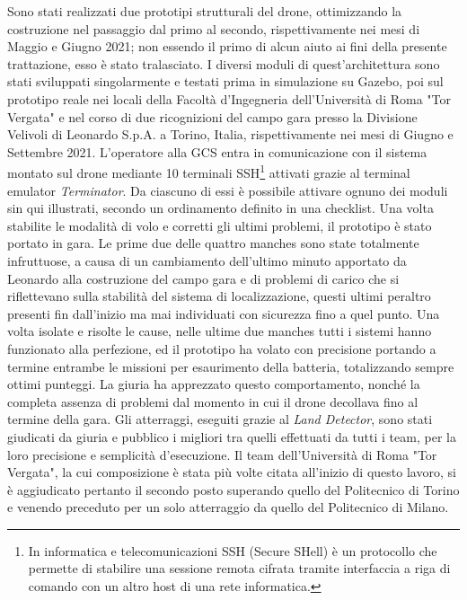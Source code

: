 \indent Sono stati realizzati due prototipi strutturali del drone, ottimizzando la costruzione nel passaggio dal primo al secondo, rispettivamente nei mesi di Maggio e Giugno 2021; non essendo il primo di alcun aiuto ai fini della presente trattazione, esso è stato tralasciato. I diversi moduli di quest'architettura sono stati sviluppati singolarmente e testati prima in simulazione su Gazebo, poi sul prototipo reale nei locali della Facoltà d'Ingegneria dell'Università di Roma "Tor Vergata" e nel corso di due ricognizioni del campo gara presso la Divisione Velivoli di Leonardo S.p.A. a Torino, Italia, rispettivamente nei mesi di Giugno e Settembre 2021. L'operatore alla GCS entra in comunicazione con il sistema montato sul drone mediante 10 terminali SSH\footnote{In informatica e telecomunicazioni SSH (Secure SHell) è un protocollo che permette di stabilire una sessione remota cifrata tramite interfaccia a riga di comando con un altro host di una rete informatica.} attivati grazie al terminal emulator \emph{Terminator}. Da ciascuno di essi è possibile attivare ognuno dei moduli sin qui illustrati, secondo un ordinamento definito in una checklist. Una volta stabilite le modalità di volo e corretti gli ultimi problemi, il prototipo è stato portato in gara. Le prime due delle quattro manches sono state totalmente infruttuose, a causa di un cambiamento dell'ultimo minuto apportato da Leonardo alla costruzione del campo gara e di problemi di carico che si riflettevano sulla stabilità del sistema di localizzazione, questi ultimi peraltro presenti fin dall'inizio ma mai individuati con sicurezza fino a quel punto. Una volta isolate e risolte le cause, nelle ultime due manches tutti i sistemi hanno funzionato alla perfezione, ed il prototipo ha volato con precisione portando a termine entrambe le missioni per esaurimento della batteria, totalizzando sempre ottimi punteggi. La giuria ha apprezzato questo comportamento, nonché la completa assenza di problemi dal momento in cui il drone decollava fino al termine della gara. Gli atterraggi, eseguiti grazie al \emph{Land Detector}, sono stati giudicati da giuria e pubblico i migliori tra quelli effettuati da tutti i team, per la loro precisione e semplicità d'esecuzione. Il team dell'Università di Roma "Tor Vergata", la cui composizione è stata più volte citata all'inizio di questo lavoro, si è aggiudicato pertanto il secondo posto superando quello del Politecnico di Torino e venendo preceduto per un solo atterraggio da quello del Politecnico di Milano.
